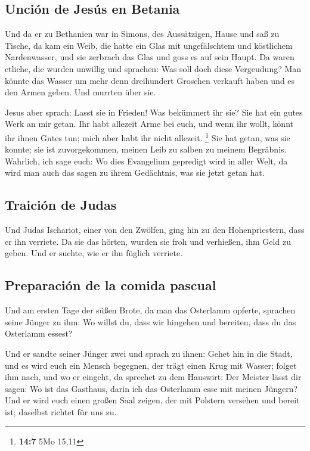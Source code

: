 \hypertarget{unciuxf3n-de-jesuxfas-en-betania}{%
\subsection{Unción de Jesús en
Betania}\label{unciuxf3n-de-jesuxfas-en-betania}}

 Und da er zu Bethanien war in Simons, des Aussätzigen,
Hause und saß zu Tische, da kam ein Weib, die hatte ein Glas mit
ungefälschtem und köstlichem Nardenwasser, und sie zerbrach das Glas und
goss es auf sein Haupt.  Da waren etliche, die wurden
unwillig und sprachen: Was soll doch diese Vergeudung? 
Man könnte das Wasser um mehr denn dreihundert Groschen verkauft haben
und es den Armen geben. Und murrten über sie.

 Jesus aber sprach: Lasst sie in Frieden! Was bekümmert
ihr sie? Sie hat ein gutes Werk an mir getan.  Ihr habt
allezeit Arme bei euch, und wenn ihr wollt, könnt ihr ihnen Gutes tun;
mich aber habt ihr nicht allezeit. \footnote{\textbf{14:7} 5Mo 15,11}
 Sie hat getan, was sie konnte; sie ist zuvorgekommen,
meinen Leib zu salben zu meinem Begräbnis.  Wahrlich, ich
sage euch: Wo dies Evangelium gepredigt wird in aller Welt, da wird man
auch das sagen zu ihrem Gedächtnis, was sie jetzt getan hat.

\hypertarget{traiciuxf3n-de-judas}{%
\subsection{Traición de Judas}\label{traiciuxf3n-de-judas}}

 Und Judas Ischariot, einer von den Zwölfen, ging hin zu
den Hohenpriestern, dass er ihn verriete.  Da sie das
hörten, wurden sie froh und verhießen, ihm Geld zu geben. Und er suchte,
wie er ihn füglich verriete.

\hypertarget{preparaciuxf3n-de-la-comida-pascual}{%
\subsection{Preparación de la comida
pascual}\label{preparaciuxf3n-de-la-comida-pascual}}

 Und am ersten Tage der süßen Brote, da man das Osterlamm
opferte, sprachen seine Jünger zu ihm: Wo willst du, dass wir hingehen
und bereiten, dass du das Osterlamm essest?

 Und er sandte seiner Jünger zwei und sprach zu ihnen:
Gehet hin in die Stadt, und es wird euch ein Mensch begegnen, der trägt
einen Krug mit Wasser; folget ihm nach,  und wo er
eingeht, da sprechet zu dem Hauswirt: Der Meister lässt dir sagen: Wo
ist das Gasthaus, darin ich das Osterlamm esse mit meinen Jüngern?
 Und er wird euch einen großen Saal zeigen, der mit
Polstern versehen und bereit ist; daselbst richtet für uns zu.

